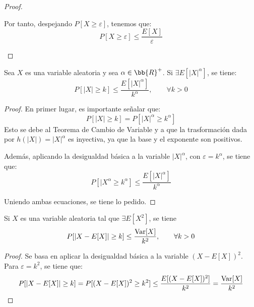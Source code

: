 \begin{proof}
\begin{itemize}
        Por tanto, despejando $P[X\geq \varepsilon]$, tenemos que:
        \begin{equation*}
            P[X\geq \varepsilon] \leq \frac{E[X]}{\varepsilon}
        \end{equation*}
    \end{itemize}
\end{proof}

\begin{coro}
    Sea $X$ es una variable aleatoria y sea $\alpha\in \bb{R}^+$. Si $\exists E[|X|^\alpha]$, se tiene:
    \begin{equation*}
        P[|X|\geq k]\leq \frac{E[|X|^\alpha]}{k^\alpha},\qquad \forall k>0
    \end{equation*}
\end{coro}
\begin{proof}
    En primer lugar, es importante señalar que:
    \begin{equation*}
        P[|X|\geq k]=P[|X|^\alpha \geq k^\alpha]
    \end{equation*}
    Esto se debe al Teorema de Cambio de Variable y a que la trasformación dada por $h(|X|)=|X|^\alpha$ es inyectiva, ya que la base y el exponente son positivos.

    Además, aplicando la desigualdad básica a la variable $|X|^\alpha$, con $\varepsilon=k^\alpha$, se tiene que:
    \begin{equation*}
        P[|X^\alpha\geq k^\alpha]\leq \frac{E[|X|^\alpha]}{k^\alpha}
    \end{equation*}

    Uniendo ambas ecuaciones, se tiene lo pedido.
\end{proof}

\begin{coro}
    Si $X$ es una variable aleatoria tal que $\exists E[X^2]$, se tiene
    \begin{equation*}
        P[|X-E[X]|\geq k]\leq \frac{\operatorname{Var}[X]}{k^2},\qquad \forall k>0
    \end{equation*}
\end{coro}
\begin{proof}
    Se basa en aplicar la desigualdad básica a la variable $(X-E[X])^2$. Para $\varepsilon=k^2$, se tiene que:
    \begin{equation*}
        P[|X-E[X]|\geq k] = P[(X-E[X])^2\geq k^2] \leq \frac{E[(X-E[X])^2]}{k^2} = \frac{\operatorname{Var}[X]}{k^2}
    \end{equation*}
\end{proof}

